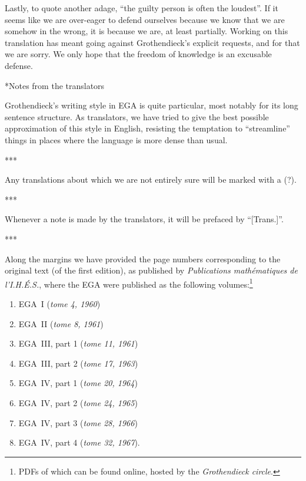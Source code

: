 \documentclass[openany,oneside]{amsbook}
\makeatletter
\theoremstyle{ega-env-style}
\theoremstyle{ega-thm-env-style}
\theoremstyle{ega-defn-env-style}
\def\section{\@startsection{section}{1}%
  \z@{.7\linespacing\@plus\linespacing}{.5\linespacing}%
  {\normalfont\bfseries\Large\scshape\centering}}
\def\unsure#1{#1 {\color{red}(?)}}
\def\sectionbreak{\begin{center}***\end{center}}
\makeatother
\begin{document}
Lastly, to quote another adage, ``the guilty person is often the loudest''.
If it seems like we are over-eager to defend ourselves because we know that we are somehow in the wrong, it is because we are, at least partially.
Working on this translation has meant going against Grothendieck's explicit requests, and for that we are sorry.
We only hope that the freedom of knowledge is an excusable defense.

\section*{Notes from the translators}

Grothendieck's writing style in EGA is quite particular, most notably for its long sentence structure.
As translators, we have tried to give the best possible approximation of this style in English, resisting the temptation to ``streamline'' things in places where the language is more dense than usual.

\sectionbreak

\unsure{Any translations about which we are not entirely sure will be marked with a}.

\sectionbreak

Whenever a note is made by the translators, it will be prefaced by ``[Trans.]''.

\sectionbreak

Along the margins we have provided the page numbers corresponding to the original text (of the first edition), as published by \emph{Publications math\'ematiques de l'I.H.\'E.S.}, where the EGA were published as the following volumes:\footnote{PDFs of which can be found online, hosted by the \emph{Grothendieck circle}.}
\begin{enumerate}
  \item[--] EGA~I (\emph{tome 4, 1960})
  \item[--] EGA~II (\emph{tome 8, 1961})
  \item[--] EGA~III, part 1 (\emph{tome 11, 1961})
  \item[--] EGA~III, part 2 (\emph{tome 17, 1963})
  \item[--] EGA~IV, part 1 (\emph{tome 20, 1964})
  \item[--] EGA~IV, part 2 (\emph{tome 24, 1965})
  \item[--] EGA~IV, part 3 (\emph{tome 28, 1966})
  \item[--] EGA~IV, part 4 (\emph{tome 32, 1967}).
\end{enumerate}
\end{document}
